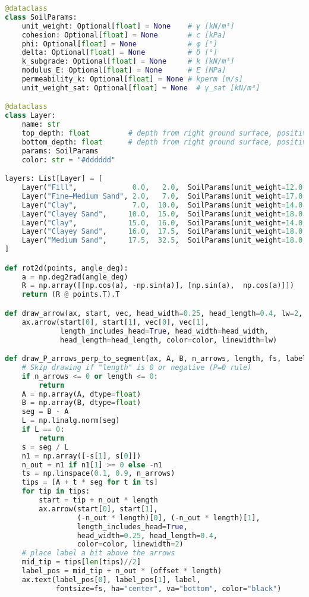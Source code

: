 \begin{lstlisting}[language=Python]
@dataclass
class SoilParams:
    unit_weight: Optional[float] = None    # γ [kN/m³]
    cohesion: Optional[float] = None       # c [kPa]
    phi: Optional[float] = None            # φ [°]
    delta: Optional[float] = None          # δ [°]
    k_subgrade: Optional[float] = None     # k [kN/m³]
    modulus_E: Optional[float] = None      # E [MPa]
    permeability_k: Optional[float] = None # kperm [m/s]
    unit_weight_sat: Optional[float] = None  # γ_sat [kN/m³]

@dataclass
class Layer:
    name: str
    top_depth: float         # depth from right ground surface, positive downward [m]
    bottom_depth: float      # depth from right ground surface, positive downward [m]
    params: SoilParams
    color: str = "#dddddd"

layers: List[Layer] = [
    Layer("Fill",             0.0,   2.0,  SoilParams(unit_weight=12.0, cohesion=20, phi=15.0, unit_weight_sat=12.0)),
    Layer("Fine–Medium Sand", 2.0,   7.0,  SoilParams(unit_weight=17.0, cohesion=0,  phi=30,   unit_weight_sat=19.0)),
    Layer("Clay",             7.0,  10.0,  SoilParams(unit_weight=14.0, cohesion=25, phi=17.5, unit_weight_sat=14.0)),
    Layer("Clayey Sand",     10.0,  15.0,  SoilParams(unit_weight=18.0, cohesion=0,  phi=25,   unit_weight_sat=20.0)),
    Layer("Clay",            15.0,  16.0,  SoilParams(unit_weight=14.0, cohesion=25, phi=17.5, unit_weight_sat=14.0)),
    Layer("Clayey Sand",     16.0,  17.5,  SoilParams(unit_weight=18.0, cohesion=0,  phi=25,   unit_weight_sat=20.0)),
    Layer("Medium Sand",     17.5,  32.5,  SoilParams(unit_weight=18.0, cohesion=0,  phi=32.5, unit_weight_sat=20.0)),
]

def rot2d(points, angle_deg):
    a = np.deg2rad(angle_deg)
    R = np.array([[np.cos(a), -np.sin(a)], [np.sin(a),  np.cos(a)]])
    return (R @ points.T).T

def draw_arrow(ax, start, vec, head_width=0.25, head_length=0.4, lw=2, color="red"):
    ax.arrow(start[0], start[1], vec[0], vec[1],
             length_includes_head=True, head_width=head_width,
             head_length=head_length, color=color, linewidth=lw)

def draw_P_arrows_perp_to_segment(ax, A, B, n_arrows, length, fs, label, offset=1.35, color="red"):
    # Skip drawing if "length" is 0 or negative (P=0 rule)
    if n_arrows <= 0 or length <= 0:
        return
    A = np.array(A, dtype=float)
    B = np.array(B, dtype=float)
    seg = B - A
    L = np.linalg.norm(seg)
    if L == 0:
        return
    s = seg / L
    n1 = np.array([-s[1], s[0]])
    n_out = n1 if n1[1] >= 0 else -n1
    ts = np.linspace(0.1, 0.9, n_arrows)
    tips = [A + t * seg for t in ts]
    for tip in tips:
        start = tip + n_out * length
        ax.arrow(start[0], start[1],
                 (-n_out * length)[0], (-n_out * length)[1],
                 length_includes_head=True,
                 head_width=0.25, head_length=0.4,
                 color=color, linewidth=2)
    # place label a bit above the arrows
    mid_tip = tips[len(tips)//2]
    label_pos = mid_tip + n_out * (offset * length)
    ax.text(label_pos[0], label_pos[1], label,
            fontsize=fs, ha="center", va="bottom", color="black")


\end{lstlisting}
